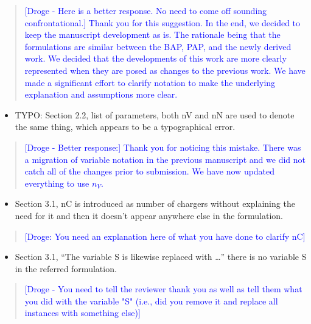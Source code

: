 \documentclass[11pt,a4paper,final]{article}
\begin{document}
\begin{quote}
\textcolor{blue}{[Droge - Here is a better response. No need to come off sounding confrontational.] Thank you for this suggestion. In the end, we decided to keep the manuscript development as is. The rationale being that the formulations are similar between the BAP, PAP, and the newly derived work. We decided that the developments of this work are more clearly represented when they are posed as changes to the previous work. We have made a significant effort to clarify notation to make the underlying explanation and assumptions more clear.}
\end{quote}

\begin{itemize}
\item TYPO: Section 2.2, list of parameters, both nV and nN are used to denote the same thing, which appears to be a typographical error.
\end{itemize}

\begin{quote}
\textcolor{blue}{[Droge - Better response:] Thank you for noticing this mistake. There was a migration of variable notation in the previous manuscript and we did not catch all of the changes prior to submission. We have now updated everything to use $n_V$.}
\end{quote}

\begin{itemize}
\item Section 3.1, nC is introduced as number of chargers without explaining the need for it and then it doesn’t appear anywhere else in the formulation.
\end{itemize}

\begin{quote}
\textcolor{blue}{[Droge: You need an explanation here of what you have done to clarify nC]}
\end{quote}

\begin{itemize}
\item Section 3.1, “The variable S is likewise replaced with …” there is no variable S in the referred formulation.
\end{itemize}

\begin{quote}
\textcolor{blue}{[Droge - You need to tell the reviewer thank you as well as tell them what you did with the variable "S" (i.e., did you remove it and replace all instances with something else)]}
\end{quote}
\end{document}
